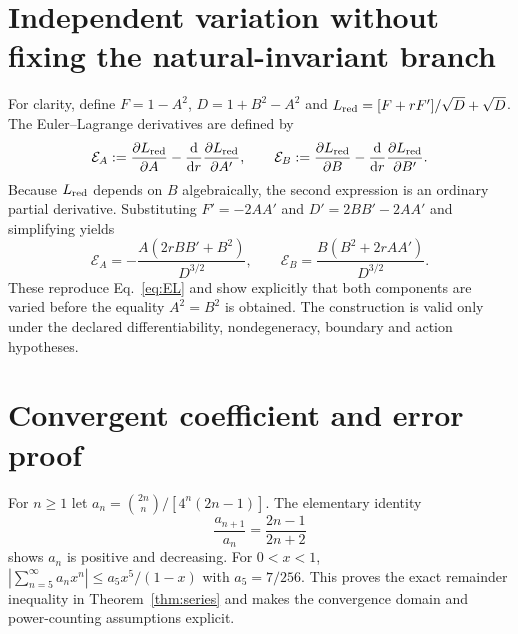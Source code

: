 \documentclass[11pt,a4paper,oneside]{report}
\numberwithin{equation}{chapter}
\theoremstyle{definition}\newtheorem{definition}[theorem]{Definition}
\theoremstyle{remark}\newtheorem{remark}[theorem]{Remark}
\begin{document}
\section{Independent variation without fixing the natural-invariant branch}\label{app:EL}
For clarity, define $F=1-A^2$, $D=1+B^2-A^2$ and
$L_{\rm red}=[F+rF']/\sqrt D+\sqrt D$.
The Euler--Lagrange derivatives are defined by
\begin{equation}
 \mathcal E_A:=\frac{\partial L_{\rm red}}{\partial A}
 -\frac{\mathrm d}{\mathrm dr}
  \frac{\partial L_{\rm red}}{\partial A'},
 \qquad
 \mathcal E_B:=\frac{\partial L_{\rm red}}{\partial B}
 -\frac{\mathrm d}{\mathrm dr}
  \frac{\partial L_{\rm red}}{\partial B'}.
\end{equation}
Because $L_{\rm red}$ depends on $B$ algebraically, the second
expression is an ordinary partial derivative.  Substituting
$F'=-2AA'$ and $D'=2BB'-2AA'$ and simplifying yields
\begin{equation}
 \mathcal E_A=-\frac{A(2rBB'+B^2)}{D^{3/2}},
 \qquad
 \mathcal E_B=\frac{B(B^2+2rAA')}{D^{3/2}}.
\end{equation}
These reproduce Eq.~\eqref{eq:EL} and show explicitly that both
components are varied before the equality $A^2=B^2$ is obtained.
The construction is valid only under the declared differentiability,
nondegeneracy, boundary and action hypotheses.

\section{Convergent coefficient and error proof}\label{app:series}
For $n\ge1$ let $a_n={2n\choose n}/[4^n(2n-1)]$.
The elementary identity
\begin{equation}
 \frac{a_{n+1}}{a_n}=\frac{2n-1}{2n+2}
\end{equation}
shows $a_n$ is positive and decreasing.  For $0<x<1$,
$|\sum_{n=5}^\infty a_nx^n|\le a_5x^5/(1-x)$ with
$a_5=7/256$.  This proves the exact remainder inequality in
Theorem~\ref{thm:series} and makes the convergence domain and
power-counting assumptions explicit.
\end{document}
